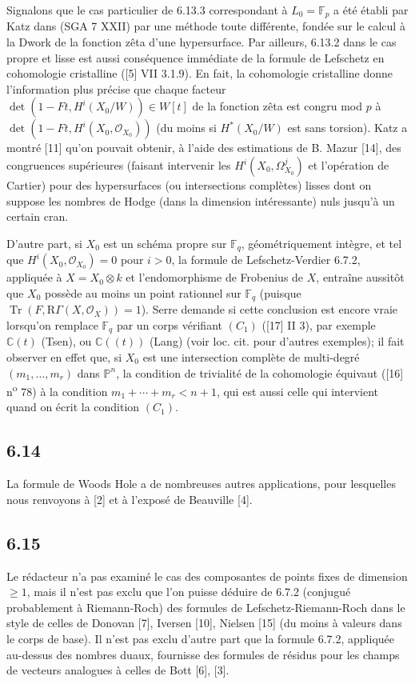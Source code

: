 \documentclass[11pt]{article}
\newcommand{\R}{\mathrm{R}}\newcommand{\RHomCore}{\mathrm{RHom}}
\providecommand{\OO}{\mathcal{O}}
\providecommand{\R}{\mathrm R}
\begin{document}
Signalons que le cas particulier de 6.13.3 correspondant à $L_0=\mathbb F_p$ a été établi par Katz dans (SGA 7 XXII) par une méthode toute différente, fondée sur le calcul à la Dwork de la fonction zêta d'une hypersurface. Par ailleurs, 6.13.2 dans le cas propre et lisse est aussi conséquence immédiate de la formule de Lefschetz en cohomologie cristalline ([5] VII 3.1.9). En fait, la cohomologie cristalline donne l'information plus précise que chaque facteur $\det(1-Ft,H^i(X_0/W))\in W[t]$ de la fonction zêta est congru mod $p$ à $\det(1-Ft,H^i(X_0,\OO_{X_0}))$ (du moins si $H^*(X_0/W)$ est sans torsion). Katz a montré [11] qu'on pouvait obtenir, à l'aide des estimations de B. Mazur [14], des congruences supérieures (faisant intervenir les $H^i(X_0,\Omega^j_{X_0})$ et l'opération de Cartier) pour des hypersurfaces (ou intersections complètes) lisses dont on suppose les nombres de Hodge (dans la dimension intéressante) nuls jusqu'à un certain cran.

D'autre part, si $X_0$ est un schéma propre sur $\mathbb F_q$, géométriquement intègre, et tel que $H^i(X_0,\OO_{X_0})=0$ pour $i>0$, la formule de Lefschetz-Verdier 6.7.2, appliquée à $X=X_0\otimes k$ et l'endomorphisme de Frobenius de $X$, entraîne aussitôt que $X_0$ possède au moins un point rationnel sur $\mathbb F_q$ (puisque $\operatorname{Tr}(F,\R\Gamma(X,\OO_X))=1$). Serre demande si cette conclusion est encore vraie lorsqu'on remplace $\mathbb F_q$ par un corps vérifiant $(C_1)$ ([17] II 3), par exemple $\mathbb C(t)$ (Tsen), ou $\mathbb C((t))$ (Lang) (voir loc. cit. pour d'autres exemples); il fait observer en effet que, si $X_0$ est une intersection complète de multi-degré $(m_1,\ldots,m_r)$ dans $\mathbb P^n$, la condition de trivialité de la cohomologie équivaut ([16] n\textsuperscript{o} 78) à la condition $m_1+\cdots+m_r<n+1$, qui est aussi celle qui intervient quand on écrit la condition $(C_1)$.

\subsection*{6.14}
La formule de Woods Hole a de nombreuses autres applications, pour lesquelles nous renvoyons à [2] et à l'exposé de Beauville [4].


\subsection*{6.15}

Le rédacteur n'a pas examiné le cas des composantes de points fixes de dimension $\geq1$, mais il n'est pas exclu que l'on puisse déduire de 6.7.2 (conjugué probablement à Riemann-Roch) des formules de Lefschetz-Riemann-Roch dans le style de celles de Donovan [7], Iversen [10], Nielsen [15] (du moins à valeurs dans le corps de base). Il n'est pas exclu d'autre part que la formule 6.7.2, appliquée au-dessus des nombres duaux, fournisse des formules de résidus pour les champs de vecteurs analogues à celles de Bott [6], [3].
\end{document}
